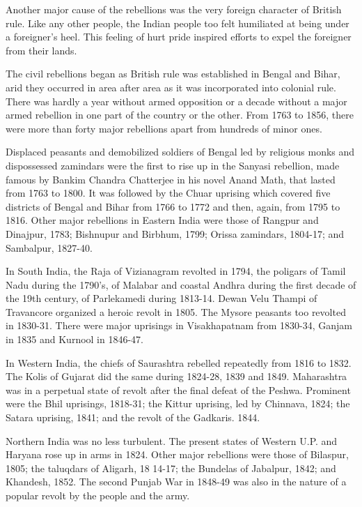 Another major cause of the rebellions was the very foreign character of British rule. Like any other people, the Indian people too felt humiliated at being under a foreigner’s heel. This feeling of hurt pride inspired efforts to expel the foreigner from their lands.

The civil rebellions began as British rule was established in Bengal and Bihar, arid they occurred in area after area as it was incorporated into colonial rule. There was hardly a year without armed opposition or a decade without a major armed rebellion in one part of the country or the other. From 1763 to 1856, there were more than forty major rebellions apart from hundreds of minor ones.

Displaced peasants and demobilized soldiers of Bengal led by religious monks and dispossessed zamindars were the first to rise up in the Sanyasi rebellion, made famous by Bankim Chandra Chatterjee in his novel Anand Math, that lasted from 1763 to 1800. It was followed by the Chuar uprising which covered five districts of Bengal and Bihar from 1766 to 1772 and then, again, from 1795 to 1816. Other major rebellions in Eastern India were those of Rangpur and Dinajpur, 1783; Bishnupur and Birbhum, 1799; Orissa zamindars, 1804-17; and Sambalpur, 1827-40.

In South India, the Raja of Vizianagram revolted in 1794, the poligars of Tamil Nadu during the 1790’s, of Malabar and coastal Andhra during the first decade of the 19th century, of Parlekamedi during 1813-14. Dewan Velu Thampi of Travancore organized a heroic revolt in 1805. The Mysore peasants too revolted in 1830-31. There were major uprisings in Visakhapatnam from 1830-34, Ganjam in 1835 and Kurnool in 1846-47.

In Western India, the chiefs of Saurashtra rebelled repeatedly from 1816 to 1832. The Kolis of Gujarat did the same during 1824-28, 1839 and 1849. Maharashtra was in a perpetual state of revolt after the final defeat of the Peshwa. Prominent were the Bhil uprisings, 1818-31; the Kittur uprising, led by Chinnava, 1824; the Satara uprising, 1841; and the revolt of the Gadkaris. 1844.

Northern India was no less turbulent. The present states of Western U.P. and Haryana rose up in arms in 1824. Other major rebellions were those of Bilaspur, 1805; the taluqdars of Aligarh, 18 14-17; the Bundelas of Jabalpur, 1842; and Khandesh, 1852. The second Punjab War in 1848-49 was also in the nature of a popular revolt by the people and the army.

